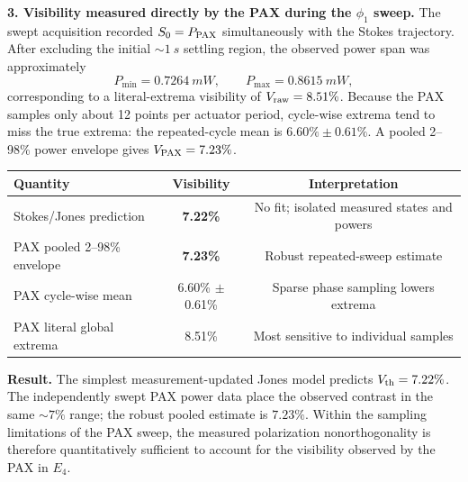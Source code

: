 \documentclass[10pt]{article}
\begin{document}
\textbf{3. Visibility measured directly by the PAX during the $\phi_1$ sweep.}
The swept acquisition recorded $S_0=P_{\rm PAX}$ simultaneously with the Stokes trajectory. After excluding the initial $\sim\SI{1}{s}$ settling region, the observed power span was approximately
\[
P_{\min}=\SI{0.7264}{mW},\qquad P_{\max}=\SI{0.8615}{mW},
\]
corresponding to a literal-extrema visibility of $V_{\rm raw}=8.51\%$. Because the PAX samples only about 12 points per actuator period, cycle-wise extrema tend to miss the true extrema: the repeated-cycle mean is $6.60\%\pm0.61\%$. A pooled 2--98\% power envelope gives $V_{\rm PAX}=7.23\%$.

\begin{center}
\begin{tabular}{lcc}
\toprule
Quantity & Visibility & Interpretation \\
\midrule
Stokes/Jones prediction & \textbf{7.22\%} & No fit; isolated measured states and powers \\
PAX pooled 2--98\% envelope & \textbf{7.23\%} & Robust repeated-sweep estimate \\
PAX cycle-wise mean & 6.60\% $\pm$ 0.61\% & Sparse phase sampling lowers extrema \\
PAX literal global extrema & 8.51\% & Most sensitive to individual samples \\
\bottomrule
\end{tabular}
\end{center}

\begin{tcolorbox}[colback=light,colframe=navy,boxrule=0.6pt,arc=1.5pt,left=5pt,right=5pt,top=4pt,bottom=4pt]
\textbf{Result.} The simplest measurement-updated Jones model predicts $V_{\rm th}=7.22\%$. The independently swept PAX power data place the observed contrast in the same $\sim7\%$ range; the robust pooled estimate is $7.23\%$. Within the sampling limitations of the PAX sweep, the measured polarization nonorthogonality is therefore quantitatively sufficient to account for the visibility observed by the PAX in $E_4$.
\end{tcolorbox}
\end{document}
